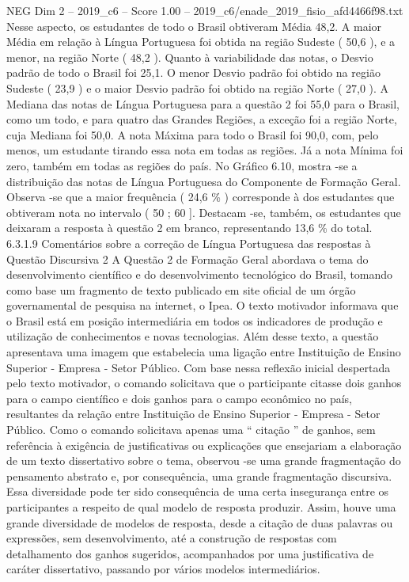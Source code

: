 \begin{textsample}{NEG Dim 2 – 2019\_c6 – Score 1.00 – 2019\_c6/enade\_2019\_fisio\_afd4466f98.txt}
Nesse aspecto, os estudantes de todo o Brasil obtiveram Média 48,2.
A maior Média em relação à Língua Portuguesa foi obtida na região Sudeste ( 50,6 ), e a menor, na região Norte ( 48,2 ).
Quanto à variabilidade das notas, o Desvio padrão de todo o Brasil foi 25,1.
O menor Desvio padrão foi obtido na região Sudeste ( 23,9 ) e o maior Desvio padrão foi obtido na região Norte ( 27,0 ).
A Mediana das notas de Língua Portuguesa para a questão 2 foi 55,0 para o Brasil, como um todo, e para quatro das Grandes Regiões, a exceção foi a região Norte, cuja Mediana foi 50,0.
A nota Máxima para todo o Brasil foi 90,0, com, pelo menos, um estudante tirando essa nota em todas as regiões.
Já a nota Mínima foi zero, também em todas as regiões do país.
No Gráfico 6.10, mostra -se a distribuição das notas de Língua Portuguesa do Componente de Formação Geral.
Observa -se que a maior frequência ( 24,6 \% ) corresponde à dos estudantes que obtiveram nota no intervalo ( 50 ; 60 ].
Destacam -se, também, os estudantes que deixaram a resposta à questão 2 em branco, representando 13,6 \% do total. 6.3.1.9 Comentários sobre a correção de Língua Portuguesa das respostas à Questão Discursiva 2 A Questão 2 de Formação Geral abordava o tema do desenvolvimento científico e do desenvolvimento tecnológico do Brasil, tomando como base um fragmento de texto publicado em site oficial de um órgão governamental de pesquisa na internet, o Ipea.
O texto motivador informava que o Brasil está em posição intermediária em todos os indicadores de produção e utilização de conhecimentos e novas tecnologias.
Além desse texto, a questão apresentava uma imagem que estabelecia uma ligação entre Instituição de Ensino Superior - Empresa - Setor Público.
Com base nessa reflexão inicial despertada pelo texto motivador, o comando solicitava que o participante citasse dois ganhos para o campo científico e dois ganhos para o campo econômico no país, resultantes da relação entre Instituição de Ensino Superior - Empresa - Setor Público.
Como o comando solicitava apenas uma “ citação ” de ganhos, sem referência à exigência de justificativas ou explicações que ensejariam a elaboração de um texto dissertativo sobre o tema, observou -se uma grande fragmentação do pensamento abstrato e, por consequência, uma grande fragmentação discursiva.
Essa diversidade pode ter sido consequência de uma certa insegurança entre os participantes a respeito de qual modelo de resposta produzir.
Assim, houve uma grande diversidade de modelos de resposta, desde a citação de duas palavras ou expressões, sem desenvolvimento, até a construção de respostas com detalhamento dos ganhos sugeridos, acompanhados por uma justificativa de caráter dissertativo, passando por vários modelos intermediários.

\end{textsample}
